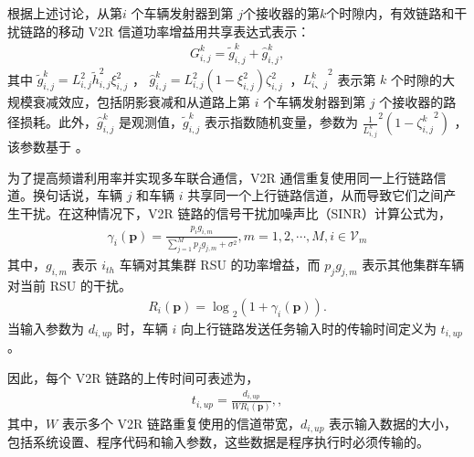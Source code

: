 根据上述讨论，从第$ i$ 个车辆发射器到第 $j $个接收器的第$ k $个时隙内，有效链路和干扰链路的移动 V2R 信道功率增益用共享表达式表示：
\begin{eqnarray}\label{E2}
G_{i,j}^k={\widetilde{g}}_{i,j}^k+{\hat{g}}_{i,j}^k,
\end{eqnarray}
其中 ${\widetilde{g}}_{i,j}^k=L_{i,j}^2{\widetilde{h}}_{i,j}^2\xi_{i,j}^2$ ， ${\hat{g}}_{i,j}^k=L_{i,j}^2\left(1-\xi_{i,j}^2\right)\zeta_{i,j}^2\ $ ，$ {L_{i、 j}^k}^2 $
表示第 $k $ 个时隙的大规模衰减效应，包括阴影衰减和从道路上第 $i$ 个车辆发射器到第 $ j $ 个接收器的路径损耗。此外，${\hat{g}}_{i,j}^k$ 是观测值，${\widetilde{g}}_{i,j}^k$ 表示指数随机变量，参数为 $\frac{1}{L_{i,j}^k}^2({1-{\zeta_{i,j}^k}^2}) $ ，该参数基于 \cite{Xie2020}。

为了提高频谱利用率并实现多车联合通信，V2R 通信重复使用同一上行链路信道。换句话说，车辆 $j$ 和车辆 $i$ 共享同一个上行链路信道，从而导致它们之间产生干扰。在这种情况下，V2R 链路的信号干扰加噪声比（SINR）计算公式为，
\begin{eqnarray}\label{E3}
\gamma_i\left(\mathbf{p}\right)=\frac{p_ig_{i,m}}{{\sum_{j=1}^{M}{p_jg_{j,m}}+\sigma^2}}, m=1,2,\cdots ,M , i\in {{\mathcal{V}}_{m}}
\end{eqnarray}
其中，$g_{i,m}$ 表示 $i_{th}$ 车辆对其集群 RSU 的功率增益，而 ${p_jg_{j,m}}$ 表示其他集群车辆对当前 RSU 的干扰。
\begin{eqnarray}\label{E4}
{R_i\left(\mathbf{p}\right)=\log}_2{\left(1+ \gamma_i\left(\mathbf{p}\right) \right)}.
\end{eqnarray}
当输入参数为 $d_{i,up}$ 时，车辆 $i$ 向上行链路发送任务输入时的传输时间定义为 $t_{i,up}$。

因此，每个 V2R 链路的上传时间可表述为，
\begin{eqnarray}\label{E6}
t_{i,up}=\frac{d_{i,up}}{WR_i\left(\mathbf{p}\right)},,
\end{eqnarray}
其中，$W$ 表示多个 V2R 链路重复使用的信道带宽，$d_{i,up}$ 表示输入数据的大小，包括系统设置、程序代码和输入参数，这些数据是程序执行时必须传输的。


